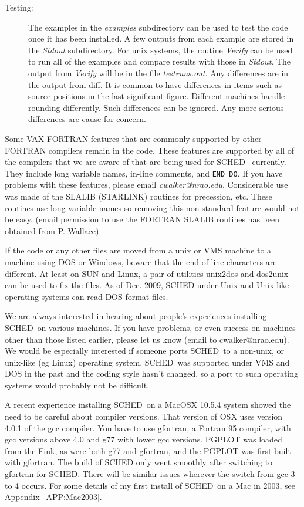 \documentclass{report}
\newcommand{\sched}{{\sc SCHED}}
\newcommand{\schedb}{{\sc SCHED~}}
\begin{document}
\begin{description}
\item [Testing:] The examples in the {\sl examples} subdirectory can
be used to test the code once it has been installed.  A few outputs
from each example are stored in the {\sl Stdout} subdirectory.  For
unix systems, the routine {\sl Verify} can be used to run all of the
examples and compare results with those in {\sl Stdout}.  The output
from {\sl Verify} will be in the file {\sl testruns.out}.  Any
differences are in the output from diff.  It is common to have
differences in items such as source positions in the last significant
figure.  Different machines handle rounding differently.  Such
differences can be ignored.  Any more serious differences are cause
for concern.

\end{description}

Some VAX FORTRAN features that are commonly supported by other FORTRAN
compilers remain in the code.  These features are supported by all of
the compilers that we are aware of that are being used for \schedb
currently.  They include long variable names, in-line comments, and
{\tt END DO}.  If you have problems with these features, please email
{\sl cwalker@nrao.edu}.  Considerable use was made of the SLALIB
(STARLINK) routines for precession, etc.  These routines use long
variable names so removing this non-standard feature would not be
easy. (email permission to use the FORTRAN SLALIB routines has been
obtained from P. Wallace).

If the code or any other files are moved from a unix or VMS machine to
a machine using DOS or Windows, beware that the end-of-line characters
are different.  At least on SUN and Linux, a pair of utilities
unix2dos and dos2unix can be used to fix the files.  As of Dec. 2009,
SCHED under Unix and Unix-like operating systems can read DOS format
files.

We are always interested in hearing about people's experiences
installing \schedb on various machines.  If you have problems, or even
success on machines other than those listed earlier, please let us
know (email to cwalker@nrao.edu).  We would be especially interested
if someone ports \schedb to a non-unix, or unix-like (eg Linux)
operating system.  \schedb was supported under VMS and DOS in the
past and the coding style hasn't changed, so a port to such operating
systems would probably not be difficult.

A recent experience installing \schedb on a MacOSX 10.5.4 system
showed the need to be careful about compiler versions.  That version
of OSX uses version 4.0.1 of the gcc compiler.  You have to use
gfortran, a Fortran 95 compiler, with gcc versions above 4.0 and g77
with lower gcc versions.  PGPLOT was loaded from the Fink, as were
both g77 and gfortran, and the PGPLOT was first built with gfortran.
The build of SCHED only went smoothly after switching to gfortran for
\sched.  There will be similar issues wherever the switch from gcc 3
to 4 occurs.  For some details of my first install of \schedb on a Mac
in 2003, see Appendix~\ref{APP:Mac2003}.
\end{document}
